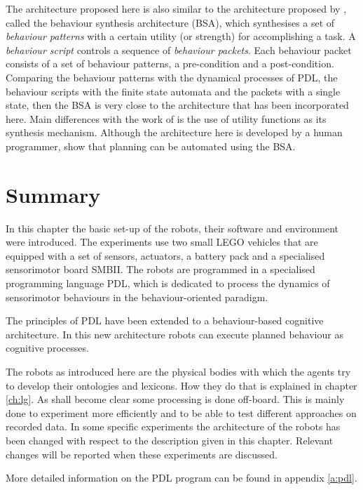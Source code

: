 
The architecture proposed here is also similar to the architecture proposed by \citep{barnes:1996,barnesetal:1997}, called the behaviour synthesis architecture (BSA), which synthesises a set of {\em behaviour patterns} with a certain utility (or strength) for accomplishing a task. A {\em behaviour script} controls a sequence of {\em behaviour packets}. Each behaviour packet consists of a set of behaviour patterns, a pre-condition and a post-condition. Comparing the behaviour patterns with the dynamical processes of PDL, the behaviour scripts with the finite state automata and the packets with a single state, then the BSA is very close to the architecture that has been incorporated here. Main differences with the work of \citep{barnes:1996} is the use of utility functions as its synthesis mechanism. Although the architecture here is developed by a human programmer, \citep{barnesetal:1997} show that planning can be automated using the BSA.


\section{Summary}

In this chapter the basic set-up of the robots, their software and environment were introduced. The experiments use two small LEGO vehicles that are equipped with a set of sensors, actuators, a battery pack and a specialised sensorimotor board SMBII. The robots are programmed in a specialised programming language PDL, which is dedicated to process the dynamics of sensorimotor behaviours in the behaviour-oriented paradigm.

The principles of PDL have been extended to a behaviour-based cognitive architecture. In this new architecture robots can execute planned behaviour as cognitive processes.

The robots as introduced here are the physical bodies with which the agents try to develop their ontologies and lexicons. How they do that is explained in chapter \ref{ch:lg}. As shall become clear some processing is done off-board. This is mainly done to experiment more efficiently and to be able to test different approaches on recorded data.  In some specific experiments the architecture of the robots has been changed with respect to the description given in this chapter. Relevant changes will be reported when these experiments are discussed.

 More detailed information on the PDL program can be found in appendix \ref{a:pdl}.







